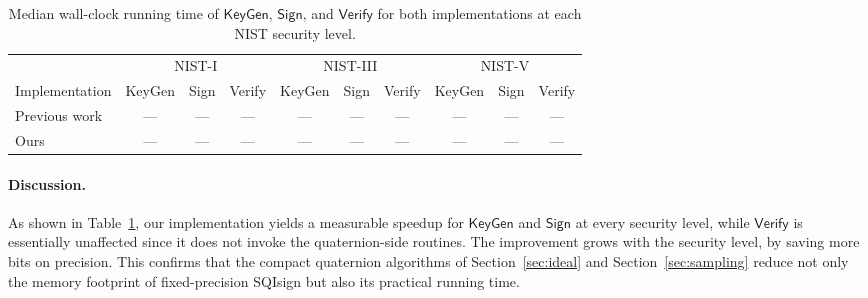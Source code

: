 \begin{table}[h]
\centering
\caption{Median wall-clock running time of $\textsf{KeyGen}$,
$\textsf{Sign}$, and $\textsf{Verify}$ for both implementations
at each NIST security level.}
\label{tab:perf}
\setlength{\tabcolsep}{2.5pt}
\begin{tabular}{l ccc ccc ccc}
\toprule
& \multicolumn{3}{c}{NIST-I}
& \multicolumn{3}{c}{NIST-III}
& \multicolumn{3}{c}{NIST-V} \\
\cmidrule(lr){2-4}\cmidrule(lr){5-7}\cmidrule(lr){8-10}
Implementation
& KeyGen & Sign & Verify
& KeyGen & Sign & Verify
& KeyGen & Sign & Verify \\
\midrule
Previous work~\cite{KLKL25}
& --- & --- & ---
& --- & --- & ---
& --- & --- & --- \\
Ours
& --- & --- & ---
& --- & --- & ---
& --- & --- & --- \\
\bottomrule
\end{tabular}
\end{table}

\paragraph{Discussion.}
As shown in Table~\ref{tab:perf}, our implementation yields a measurable
speedup for $\textsf{KeyGen}$ and $\textsf{Sign}$ at every security level,
while $\textsf{Verify}$ is essentially unaffected since it does not invoke
the quaternion-side routines.
The improvement grows with the security level, by saving more bits on precision.
This confirms that the compact quaternion algorithms of Section~\ref{sec:ideal} and Section~\ref{sec:sampling} reduce not only the memory footprint of fixed-precision SQIsign but also its practical running time.